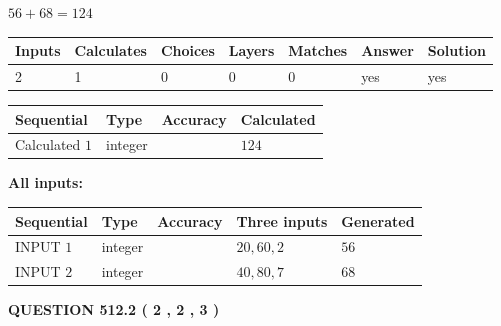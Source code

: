 \documentclass[12pt]{article}
\begin{document}
 

$ %
56 +  %
68=   %
124$
 
 
\noindent{}
 
 

 
   
   
   
   
\noindent\begin{tabular}{|l|l|l|l|l|l|l|}
 \hline
Inputs & Calculates & Choices & Layers & Matches & Answer & Solution \\ \hline
 2  & 
 1  & 
 0
  & 
 0  & 
 0  & 
  yes & 
  yes 
  \\ \hline
 \end{tabular}
   
   
   
   
\noindent{}
   
   
  
  
\noindent\begin{tabular}{|l|l|l|l|}
\hline
 Sequential & Type & Accuracy & Calculated \\ 
\hline
 
 
  Calculated $  1 $ & integer &  & 
  $ 124 $ 
 \\  \hline  
 \end{tabular}
   
   
   
   
\noindent\vspace{0.1in}\hspace{-0.08in} {\textbf{\Large{All inputs: }}}
   
   
  
  
\noindent\begin{tabular}{|l|l|l|l|l|}
\hline
 Sequential & Type & Accuracy & Three inputs & Generated \\ 
\hline
 
 
  INPUT $  1 $ & integer &  & $
 20
 , 
 60
 , 
 2
 $ & $ 56 $ 
 \\  \hline  
 
 
  INPUT $  2 $ & integer &  & $
 40
 , 
 80
 , 
 7
 $ & $ 68 $ 
 \\  \hline  
 \end{tabular}
   
   
  
\vspace{0.2in}
  
{\textbf{\Large{QUESTION
512.2 
 ( 2 , 2 , 3 )
}}}
  
\end{document}
